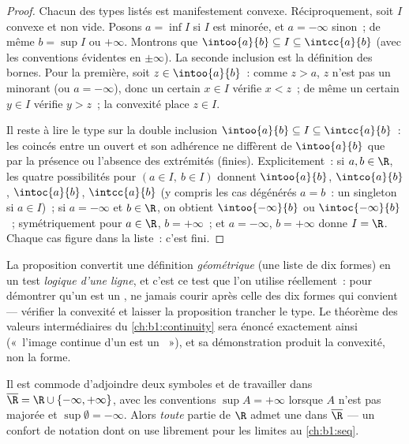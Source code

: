 \begin{proof}
Chacun des types listés est manifestement convexe. Réciproquement,
soit $I$ convexe et non vide. Posons $a = \inf I$ si $I$ est minorée,
et $a = -\infty$ sinon~; de même $b = \sup I$ ou $+\infty$. Montrons
que $\intoo{a}{b} \subseteq I \subseteq \intcc{a}{b}$ (avec les
conventions évidentes en $\pm\infty$). La seconde inclusion est la
définition des bornes. Pour la première, soit $z \in \intoo{a}{b}$~:
comme $z > a$, $z$ n'est pas un minorant (ou $a = -\infty$), donc un
certain $x \in I$ vérifie $x < z$~; de même un certain $y \in I$
vérifie $y > z$~; la convexité place $z \in I$.

Il reste à lire le type sur la double inclusion
$\intoo{a}{b} \subseteq I \subseteq \intcc{a}{b}$~: les 
coincés entre un  ouvert et son adhérence ne diffèrent
de $\intoo{a}{b}$ que par la présence ou l'absence des extrémités
(finies). Explicitement~: si $a, b \in \R$, les quatre
possibilités pour $(a \in I,\ b \in I)$ donnent $\intoo{a}{b}$,
$\intco{a}{b}$, $\intoc{a}{b}$, $\intcc{a}{b}$ (y compris les cas
dégénérés $a = b$~: un singleton si $a \in I$)~; si $a = -\infty$
et $b \in \R$, on obtient $\intoo{-\infty}{b}$ ou
$\intoc{-\infty}{b}$~; symétriquement pour $a \in \R$, $b =
+\infty$~; et $a = -\infty$, $b = +\infty$ donne $I = \R$. Chaque
cas figure dans la liste~: c'est fini.
\end{proof}

\begin{remark}
La proposition convertit une définition \emph{géométrique} (une
liste de dix formes) en un test \emph{logique d'une ligne}, et
c'est ce test que l'on utilise réellement~: pour démontrer qu'un
 est un , ne jamais courir après celle des dix
formes qui convient --- vérifier la convexité et laisser la
proposition trancher le type. Le théorème des valeurs
intermédiaires du \cref{ch:b1:continuity} sera énoncé exactement
ainsi («~l'image continue d'un  est un ~»),
et sa démonstration produit la convexité, non la forme.
\end{remark}

\begin{remark}
Il est commode d'adjoindre deux symboles et de travailler dans
$\overline\R = \R \cup \{-\infty, +\infty\}$, avec les conventions
$\sup A = +\infty$ lorsque $A$ n'est pas majorée et $\sup \emptyset
= -\infty$. Alors \emph{toute} partie de $\R$ admet une  dans $\overline\R$ --- un confort de notation dont on use
librement pour les limites au \cref{ch:b1:seq}.
\end{remark}

